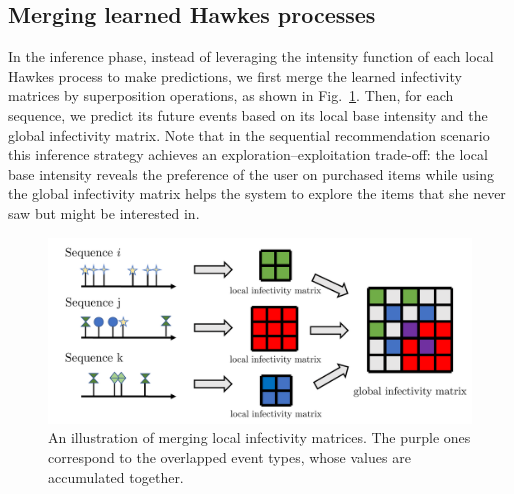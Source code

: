 \documentclass[runningheads]{llncs}
\begin{document}
\subsection{Merging learned Hawkes processes}

In the inference phase, instead of leveraging the intensity function of each local Hawkes process to make predictions, we first merge the learned infectivity matrices by superposition operations, as shown in Fig.~\ref{fig3}. 
Then, for each sequence, we predict its future events based on its local base intensity and the global infectivity matrix.
Note that in the sequential recommendation scenario this inference strategy achieves an exploration–exploitation trade-off: the local base intensity reveals the preference of the user on purchased items while using the global infectivity matrix helps the system to explore the items that she never saw but might be interested in.



\begin{figure}[t]
\centerline{\includegraphics[width=0.7\linewidth]{figure3.pdf}}
\vspace{-10pt}
\caption{An illustration of merging local infectivity matrices. The purple ones correspond to the overlapped event types, whose values are accumulated together.}
\label{fig3}
\end{figure}
\end{document}
